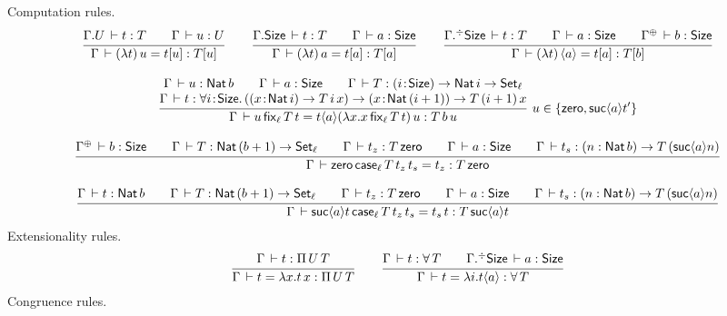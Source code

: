 \documentclass[acmlarge,review,anonymous]{acmart}\settopmatter{printfolios=true}
\begin{document}
Computation rules.
\begin{gather*}
  \ru{\cext \Gamma U \der t : T \qquad
      \Gamma \der u : U
    }{\Gamma \der (\lambda t)\,u = t[u] : T[u]}
\qquad
  \ru{\cext \Gamma \Size \der t : T \qquad
      \Gamma \der a : \Size
    }{\Gamma \der (\lambda t)\,a = t[a] : T[a]}
\qquad
  \ru{\erext \Gamma \Size \der t : T \qquad
      \Gamma \der a : \Size \qquad
      \resurrect \Gamma \der b : \Size
    }{\Gamma \der (\lambda t)\,\ann a = t[a] : T[b]}
\\[2ex]
  \rux{\Gamma \der u : \Nat b \qquad
      \Gamma \der a : \Size \qquad
      \Gamma \der T : \funT i \Size \Nat i \to \Set[\ell] \\
      \Gamma \der t : \allT i \Size (\funT x {\Nat i} T\, i\, x) \to \funT x {\Nat (i + 1)} T \,(i+1)\, x
     }{\Gamma \der u\,\fix[\ell] T t = t\ann a (\lambda x. x\,\fix[\ell] T t)\, u : T \,b \, u
     }{u \in \{\tzero, \suc a t'\}}
\\[2ex]
  \ru{\resurrect\Gamma \der b : \Size \qquad
      \Gamma \der T : \Nat (b + 1) \to \Set[\ell] \qquad
      \Gamma \der t_z : T\,\tzero \qquad
      \Gamma \der a : \Size \qquad
      \Gamma \der t_s : (n : \Nat b) \to T\,(\suc a n)
    }{\Gamma \der \tzero\,\case[\ell] T {t_z} {t_s} = t_z : T\,\tzero}
\\[2ex]
  \ru{\Gamma \der t : \Nat b \qquad
      \Gamma \der T : \Nat (b + 1) \to \Set[\ell] \qquad
      \Gamma \der t_z : T\,\tzero \qquad
      \Gamma \der a : \Size \qquad
      \Gamma \der t_s : (n : \Nat b) \to T\,(\suc a n)
    }{\Gamma \der \suc a t\,\case[\ell] T {t_z} {t_s} = t_s\,t : T\,\suc a t}
\end{gather*}
Extensionality rules.
\begin{gather*}
  \ru{\Gamma \der t : \piT U T
    }{\Gamma \der t = \lambda x. t\,x : \piT U T}
\qquad
  \ru{\Gamma \der t : \forallT T \qquad \erext \Gamma \Size \der a : \Size
    }{\Gamma \der t = \lambda i. t \ann a : \forallT T}
\end{gather*}
Congruence rules.
\end{document}
